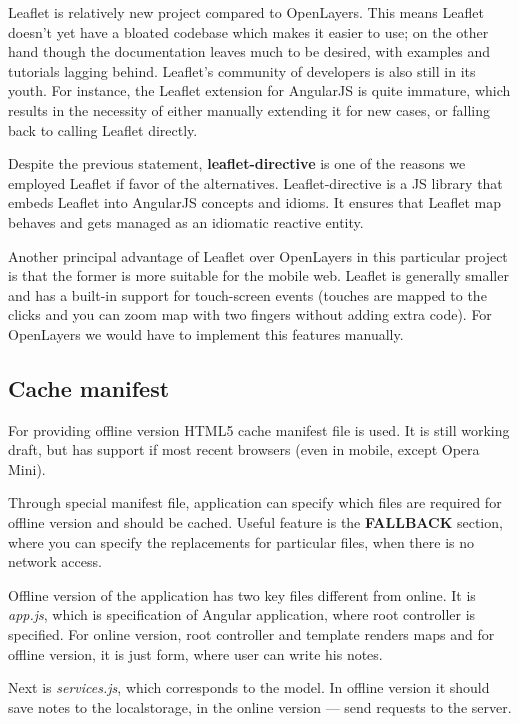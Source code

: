 \documentclass[12pt,a4paper]{article}
\begin{document}
Leaflet is relatively new project compared to OpenLayers. This means
Leaflet doesn't yet have a bloated codebase which makes it easier to
use; on the other hand though the documentation leaves much to be
desired, with examples and tutorials lagging behind. Leaflet's
community of developers is also still in its youth. For instance, the
Leaflet extension for AngularJS is quite immature, which results in
the necessity of either manually extending it for new cases, or
falling back to calling Leaflet directly.

Despite the previous statement, \textbf{leaflet-directive} is one of
the reasons we employed Leaflet if favor of the alternatives.
Leaflet-directive is a JS library that embeds Leaflet into AngularJS
concepts and idioms. It ensures that Leaflet map behaves and gets
managed as an idiomatic reactive entity.

Another principal advantage of Leaflet over OpenLayers in this
particular project is that the former is more suitable for the mobile
web. Leaflet is generally smaller and has a built-in support for
touch-screen events (touches are mapped to the clicks and you can zoom
map with two fingers without adding extra code). For OpenLayers we
would have to implement this features manually.

\subsection{Cache manifest}
For providing offline version HTML5 cache manifest file is used. It is still working
draft, but has support if most recent browsers (even in mobile, except Opera Mini).

Through special manifest file, application can specify which files are required for
offline version and should be cached. Useful feature is the \textbf{FALLBACK} section,
where you can specify the replacements for particular files, when there is no network
access.

Offline version of the application has two key files different from online.
It is \textit{app.js}, which is specification of Angular application, where root
controller is specified. For online version, root controller and template renders maps
and for offline version, it is just form, where user can write his notes.

Next is \textit{services.js}, which corresponds to the model. In
offline version it should save notes to the localstorage, in the
online version --- send requests to the server.
\end{document}
